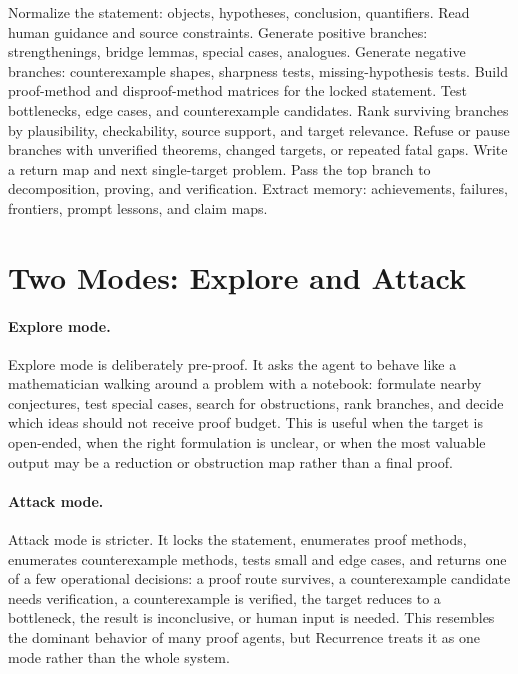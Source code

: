 \documentclass{article}
\theoremstyle{definition}
\theoremstyle{remark}
\begin{document}
\begin{algorithm}[t]
  \caption{Recurrence loop for one target}
  \label{alg:recurrence}
  \begin{algorithmic}[1]
    \STATE Normalize the statement: objects, hypotheses, conclusion, quantifiers.
    \STATE Read human guidance and source constraints.
      \STATE Generate positive branches: strengthenings, bridge lemmas, special cases, analogues.
      \STATE Generate negative branches: counterexample shapes, sharpness tests, missing-hypothesis tests.
    \ELSE
      \STATE Build proof-method and disproof-method matrices for the locked statement.
      \STATE Test bottlenecks, edge cases, and counterexample candidates.
    \ENDIF
    \STATE Rank surviving branches by plausibility, checkability, source support, and target relevance.
    \STATE Refuse or pause branches with unverified theorems, changed targets, or repeated fatal gaps.
    \STATE Write a return map and next single-target problem.
    \STATE Pass the top branch to decomposition, proving, and verification.
    \STATE Extract memory: achievements, failures, frontiers, prompt lessons, and claim maps.
  \end{algorithmic}
\end{algorithm}

\section{Two Modes: Explore and Attack}

\paragraph{Explore mode.}
Explore mode is deliberately pre-proof. It asks the agent to behave like a mathematician walking around a problem with a notebook: formulate nearby conjectures, test special cases, search for obstructions, rank branches, and decide which ideas should not receive proof budget. This is useful when the target is open-ended, when the right formulation is unclear, or when the most valuable output may be a reduction or obstruction map rather than a final proof.

\paragraph{Attack mode.}
Attack mode is stricter. It locks the statement, enumerates proof methods, enumerates counterexample methods, tests small and edge cases, and returns one of a few operational decisions: a proof route survives, a counterexample candidate needs verification, a counterexample is verified, the target reduces to a bottleneck, the result is inconclusive, or human input is needed. This resembles the dominant behavior of many proof agents, but Recurrence treats it as one mode rather than the whole system.
\end{document}
